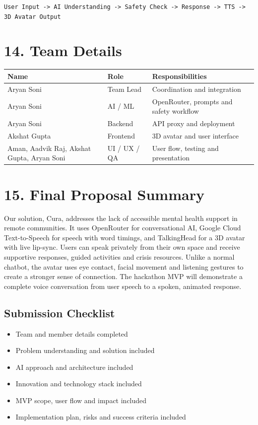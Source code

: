 \documentclass[9pt,a4paper]{article}
\begin{document}
\begin{center}
\texttt{User Input -> AI Understanding -> Safety Check -> Response -> TTS -> 3D Avatar Output}
\end{center}

\section*{14. Team Details}

\begin{tabularx}{\textwidth}{@{}p{4cm}p{3.2cm}Y@{}}
\textbf{Name} & \textbf{Role} & \textbf{Responsibilities} \\
\hline
Aryan Soni & Team Lead & Coordination and integration \\
Aryan Soni & AI / ML & OpenRouter, prompts and safety workflow \\
Aryan Soni & Backend & API proxy and deployment \\
Akshat Gupta & Frontend & 3D avatar and user interface \\
Aman, Aadvik Raj, Akshat Gupta, Aryan Soni & UI / UX / QA & User flow, testing and presentation \\
\end{tabularx}

\enlargethispage{2cm}
\section*{15. Final Proposal Summary}

Our solution, Cura, addresses the lack of accessible mental health support in
remote communities. It uses OpenRouter for conversational AI, Google Cloud
Text-to-Speech for speech with word timings, and TalkingHead for a 3D avatar
with live lip-sync. Users can speak privately from their own space and receive
supportive responses, guided activities and crisis resources. Unlike a normal
chatbot, the avatar uses eye contact, facial movement and listening gestures to
create a stronger sense of connection. The hackathon MVP will demonstrate a
complete voice conversation from user speech to a spoken, animated response.

\subsection*{Submission Checklist}

\begin{itemize}
  \item [ ] Team and member details completed
  \item [ ] Problem understanding and solution included
  \item [ ] AI approach and architecture included
  \item [ ] Innovation and technology stack included
  \item [ ] MVP scope, user flow and impact included
  \item [ ] Implementation plan, risks and success criteria included
\end{itemize}
\end{document}
